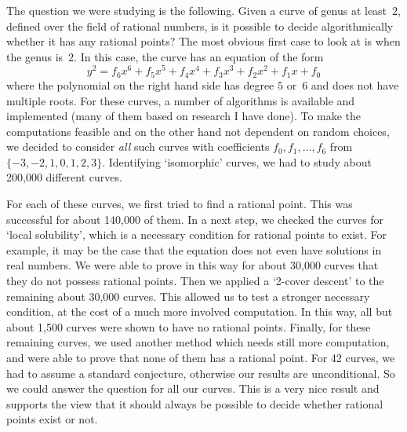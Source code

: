 The question we were studying is the following. Given a curve of
genus at least~$2$, defined over the field of rational numbers, is it
possible to decide algorithmically whether it has any rational points?
The most obvious first case to look at is when the genus is~$2$.
In this case, the curve has an equation of the form
\[ y^2 = f_6 x^6 + f_5 x^5 + f_4 x^4 + f_3 x^3 + f_2 x^2 + f_1 x + f_0 \]
where the polynomial on the right hand side has degree $5$ or~$6$ and
does not have multiple roots. For these curves, a number of algorithms
is available and implemented (many of them based on research I have
done). To make the computations feasible and on the other hand not
dependent on random choices, we decided to consider {\em all} such
curves with coefficients $f_0, f_1, \dots, f_6$ from $\{-3,-2,1,0,1,2,3\}$.
Identifying `isomorphic' curves, we had to study about 200,000
different curves.

For each of these curves, we first tried to find a rational point.
This was successful for about 140,000 of them. In a next step, we
checked the curves for `local solubility', which is a necessary
condition for rational points to exist. For example, it may be the
case that the equation does not even have solutions in real numbers.
We were able to prove in this way for about 30,000 curves that they
do not possess rational points. Then we applied a `2-cover descent'
to the remaining about 30,000 curves. This allowed us to test a
stronger necessary condition, at the cost of a much more involved
computation. In this way, all but about 1,500 curves were shown to
have no rational points. Finally, for these remaining curves, we used
another method which needs still more computation, and were able to
prove that none of them has a rational point. For 42 curves, we had
to assume a standard conjecture, otherwise our results are
unconditional. So we could answer the question for all our curves.
This is a very nice result and supports the view that it should
always be possible to decide whether rational points exist or not.


